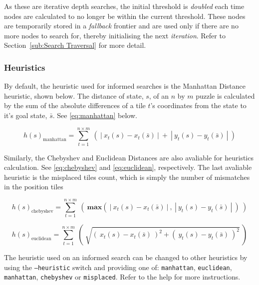 As these are iterative depth searches, the initial threshold is \emph{doubled}
each time nodes are calculated to no longer be within the current threshold.
These nodes are temporarily stored in a \emph{fallback} frontier and are used
only if there are no more nodes to search for, thereby initialising the next
\emph{iteration}. Refer to Section~\ref{sub:Search Traversal} for more detail.

\subsubsection{Heuristics}
\label{subs:Heuristics}

By default, the heuristic used for informed searches is the Manhattan Distance
heuristic, shown below. The distance of state, $s$, of an $n$ by $m$ puzzle
is calculated by the sum of the absolute differences of a tile $t$'s coordinates
from the state to it's goal state, $\bar{s}$. See \ref{eq:manhattan} below.

\begin{equation} \label{eq:manhattan}
  h(s)_{\text{manhattan}} =
    \sum_{t=1}^{n \times m} \ ( \
      | \ x_{t}(s) - x_{t}(\bar{s}) \ | \ + \ | \ y_{t}(s) - y_{t}(\bar{s}) \ |
    \ )
\end{equation}

Similarly, the Chebyshev and Euclidean Distances are also avaliable for
heuristics calculation. See \ref{eq:chebyshev} and \ref{eq:euclidean},
respectively. The last avaliable heuristic is the misplaced tiles count,
which is simply the number of mismatches in the position tiles

\begin{equation} \label{eq:chebyshev}
  h(s)_{\text{chebyshev}} =
    \sum_{t=1}^{n \times m} \ ( \
      \mathbf{max}( \ | \ x_{t}(s) - x_{t}(\bar{s}) \ | \ , \ | \ y_{t}(s) - y_{t}(\bar{s}) \ | \ )
    \ )
\end{equation}

\begin{equation} \label{eq:euclidean}
  h(s)_{\text{euclidean}} =
    \sum_{t=1}^{n \times m} \ ( \
      \sqrt{ ( \ x_{t}(s) - x_{t}(\bar{s}) \ )^{2} + ( \ y_{t}(s) - y_{t}(\bar{s}) \ )^{2} }
    \ )
\end{equation}

The heuristic used on an informed search can be changed to other heuristics by
using the  \texttt{--heuristic} switch and providing one of: \texttt{manhattan},
\texttt{euclidean}, \texttt{manhattan}, \texttt{chebyshev} or
\texttt{misplaced}. Refer to the help for more instructions.

